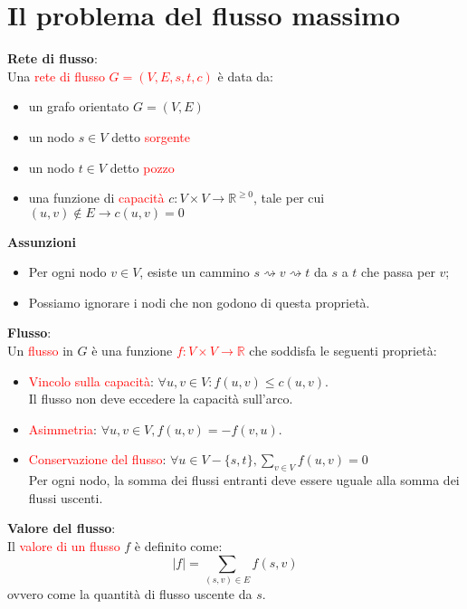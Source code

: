 \documentclass[../cheatSheetAlgoritmi.tex]{subfiles}
\begin{document}
\section{Il problema del flusso massimo}
\textbf{Rete di flusso}:\\
Una \textcolor{red}{rete di flusso $G = (V, E, s, t, c)$} è data da:
\begin{itemize}
	\item un grafo orientato $G = (V, E)$
	\item un nodo $s \in V$ detto \textcolor{red}{sorgente}
	\item un nodo $t \in V$ detto \textcolor{red}{pozzo}
	\item una funzione di \textcolor{red}{capacità} $c : V \times V \rightarrow \mathbb{R}^{\geq 0}$, tale per cui $(u, v) \notin E \rightarrow c(u, v) = 0$
\end{itemize}
\textbf{Assunzioni}
\begin{itemize}
	\item Per ogni nodo $v \in V$, esiste un cammino $s \rightsquigarrow v \rightsquigarrow t$ da $s$ a $t$ che passa per $v$;
	\item Possiamo ignorare i nodi che non godono di questa proprietà.
\end{itemize}
\textbf{Flusso}: \\
Un \textcolor{red}{flusso} in $G$ è una funzione \textcolor{red}{$f: V \times V \rightarrow \mathbb{R}$} che soddisfa le seguenti proprietà:
\begin{itemize}
	\item \textcolor{red}{Vincolo sulla capacità}: $\forall u, v \in V : f(u, v) \leq c(u,v)$.\\ Il flusso non deve eccedere la capacità sull'arco.
	\item \textcolor{red}{Asimmetria}: $\forall u, v \in V, f(u,v) = - f(v, u)$. 
	\item \textcolor{red}{Conservazione del flusso}: $\forall u \in V - \{s, t\}, \sum_{v \in V} f(u, v) = 0$ 	\\
	Per ogni nodo, la somma dei flussi entranti deve essere uguale alla somma dei flussi uscenti.
\end{itemize}
\textbf{Valore del flusso}:\\
Il \textcolor{red}{valore di un flusso} $f$ è definito come: 
\begin{equation*}
  	|f| = \sum_{(s, v) \in E} f(s, v)
\end{equation*}
ovvero come la quantità di flusso uscente da $s$.
 
\end{document}
